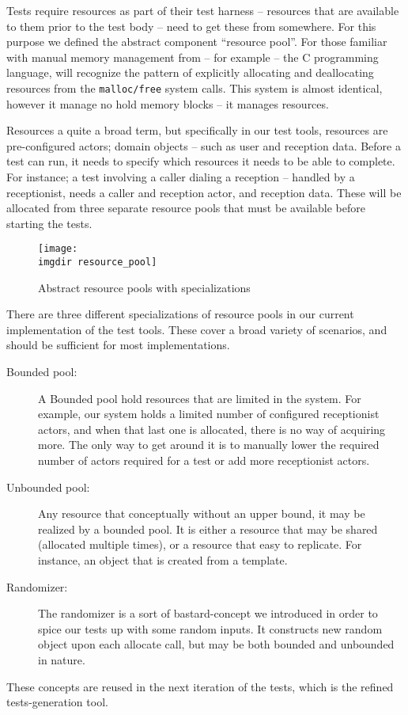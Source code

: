 \noindent Tests require resources as part of their test harness -- resources that are available to them prior to the test body -- need to get these from somewhere. For this purpose we defined the abstract component ``resource pool''. For those familiar with manual memory management from -- for example -- the C programming language, will recognize the pattern of explicitly allocating and deallocating resources from the \texttt{malloc/free} system calls. This system is almost identical, however it manage no hold memory blocks -- it manages resources.\medskip

\noindent Resources a quite a broad term, but specifically in our test tools, resources are pre-configured actors; domain objects -- such as user and reception data. Before a test can run, it needs to specify which resources it needs to be able to complete. For instance; a test involving a caller dialing a reception -- handled by a receptionist, needs a caller and reception actor, and reception data. These will be allocated from three separate resource pools that must be available before starting the tests.\medskip
\begin{figure}[!htbp]
\centering
\texttt{[image: \\imgdir resource\_pool]}
\caption{Abstract resource pools with specializations}
\label{fig:resource_pool}
\end{figure}There are three different specializations of resource pools in our current implementation of the test tools. These cover a broad variety of scenarios, and should be sufficient for most implementations.
\begin{description}
  \item[Bounded pool:] A Bounded pool hold resources that are limited in the system. For example, our system holds a limited number of configured receptionist actors, and when that last one is allocated, there is no way of acquiring more. The only way to get around it is to manually lower the required number of actors required for a test or add more receptionist actors.
  \item[Unbounded pool:] Any resource that conceptually without an upper bound, it may be realized by a bounded pool. It is either a resource that may be shared (allocated multiple times), or a resource that easy to replicate. For instance, an object that is created from a template.
  \item[Randomizer:] The randomizer is a sort of bastard-concept we introduced in order to spice our tests up with some random inputs. It constructs new random object upon each allocate call, but may be both bounded and unbounded in nature.
\end{description}
These concepts are reused in the next iteration of the tests, which is the refined tests-generation tool.

